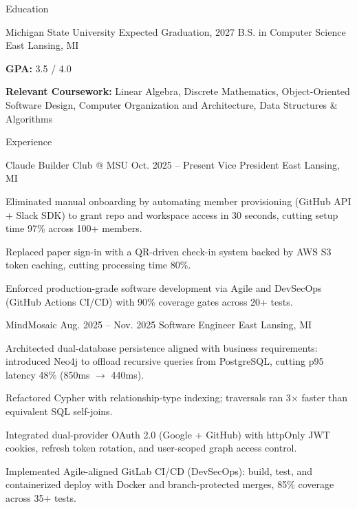 \documentclass[
	11pt
]{../../../resume}
\begin{document}
	\begin{rSection}{E}{ducation}
		\begin{rSectionEntry}
			{Michigan State University}
			{Expected Graduation, 2027}
			{B.S. in Computer Science}
			{}
			{East Lansing, MI}

			\item \textbf{GPA:} 3.5 / 4.0
			\item \textbf{Relevant Coursework:} Linear Algebra, Discrete Mathematics, Object-Oriented Software Design, Computer Organization and Architecture, Data Structures \& Algorithms
		\end{rSectionEntry}
	\end{rSection}

	\begin{rSection}{E}{xperience}
		\begin{rSectionEntry}
			{Claude Builder Club @ MSU}
			{Oct. 2025 -- Present}
			{Vice President}
			{}
			{East Lansing, MI}

			\item Eliminated manual onboarding by automating member provisioning (GitHub API + Slack SDK) to grant repo and workspace access in 30 seconds, cutting setup time 97\% across 100+ members.
			\item Replaced paper sign-in with a QR-driven check-in system backed by AWS S3 token caching, cutting processing time 80\%.
			\item Enforced production-grade software development via Agile and DevSecOps (GitHub Actions CI/CD) with 90\% coverage gates across 20+ tests.
		\end{rSectionEntry}

		\begin{rSectionEntry}
			{MindMosaic}
			{Aug. 2025 -- Nov. 2025}
			{Software Engineer}
			{}
			{East Lansing, MI}

			\item Architected dual-database persistence aligned with business requirements: introduced Neo4j to offload recursive queries from PostgreSQL, cutting p95 latency 48\% (850ms $\rightarrow$ 440ms).
			\item Refactored Cypher with relationship-type indexing; traversals ran 3$\times$ faster than equivalent SQL self-joins.
			\item Integrated dual-provider OAuth 2.0 (Google + GitHub) with httpOnly JWT cookies, refresh token rotation, and user-scoped graph access control.
			\item Implemented Agile-aligned GitLab CI/CD (DevSecOps): build, test, and containerized deploy with Docker and branch-protected merges, 85\% coverage across 35+ tests.
		\end{rSectionEntry}
	\end{rSection}
\end{document}
